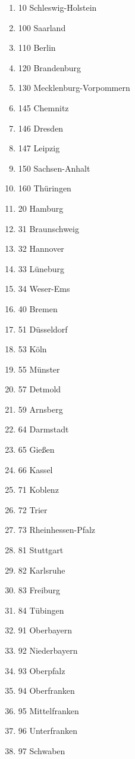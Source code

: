 \begin{enumerate}[itemsep=-6mm]
\item 10 Schleswig-Holstein
\item 100 Saarland
\item 110 Berlin
\item 120 Brandenburg
\item 130 Mecklenburg-Vorpommern
\item 145 Chemnitz
\item 146 Dresden
\item 147 Leipzig
\item 150 Sachsen-Anhalt
\item 160 Thüringen
\item 20 Hamburg
\item 31 Braunschweig
\item 32 Hannover
\item 33 Lüneburg
\item 34 Weser-Ems
\item 40 Bremen
\item 51 Düsseldorf
\item 53 Köln
\item 55 Münster
\item 57 Detmold
\item 59 Arnsberg
\item 64 Darmstadt
\item 65 Gießen
\item 66 Kassel
\item 71 Koblenz
\item 72 Trier
\item 73 Rheinhessen-Pfalz
\item 81 Stuttgart
\item 82 Karlsruhe
\item 83 Freiburg
\item 84 Tübingen
\item 91 Oberbayern
\item 92 Niederbayern
\item 93 Oberpfalz
\item 94 Oberfranken
\item 95 Mittelfranken
\item 96 Unterfranken
\item 97 Schwaben
\end{enumerate}